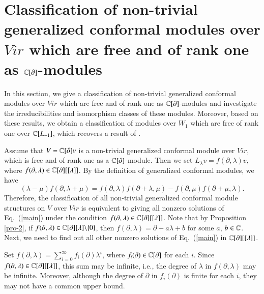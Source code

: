 \documentclass[12pt]{amsart}
\begin{document}
\section{Classification of non-trivial generalized conformal modules over $Vir$ which are free and of rank one as $\mathbb{C}[\partial]$-modules}
In this section, we give a classification of non-trivial generalized conformal modules over $Vir$ which are free and of rank one as $\mathbb{C}[\partial]$-modules and investigate the irreducibilities and isomorphism classes of these modules. Moreover, based on these results, we obtain a classification of modules over $W_1$ which are free of rank one over $\mathbb{C}[L_{-1}]$, which recovers a result of \cite{HCL}.

Assume that $V=\mathbb{C}[\partial]v$ is a non-trivial generalized conformal module over $Vir$, which is free and of rank one as a $\mathbb{C}[\partial]$-module.
Then we set $L_\lambda v=f(\partial, \lambda)v$, where $f(\partial, \lambda)\in \mathbb{C}[\partial][[\lambda]]$. By the definition of generalized conformal modules, we have
\begin{equation}\label{main}
(\lambda-\mu)f(\partial, \lambda+\mu)=f(\partial, \lambda)f(\partial+\lambda,\mu)
-f(\partial, \mu)f(\partial+\mu, \lambda).
\end{equation}
Therefore, the classification of all non-trivial generalized conformal module structures on $V$ over $Vir$ is equivalent to giving all nonzero solutions of Eq.~(\ref{main}) under the condition $f(\partial, \lambda)\in \mathbb{C}[\partial][[\lambda]]$. Note that by Proposition \ref{pro-2}, if $f(\partial, \lambda)\in \mathbb{C}[\partial][\lambda]\backslash\{0\}$, then $f(\partial, \lambda)=\partial+a \lambda+b$ for some $a$, $b\in \mathbb{C}$. Next, we need to find out all other nonzero solutions of Eq.~(\ref{main}) in $\mathbb{C}[\partial][[\lambda]]$.

Set $f(\partial, \lambda)=\sum_{i=0}^\infty f_i(\partial)\lambda^i$, where $f_i(\partial)\in \mathbb{C}[\partial]$ for each $i$.
Since $f(\partial, \lambda)\in \mathbb{C}[\partial][[\lambda]]$, this sum may be infinite, i.e., the degree of $\lambda$ in $f(\partial, \lambda)$ may be infinite. Moreover, although the degree of $\partial$ in $f_i(\partial)$ is finite for each $i$, they may not have
a common upper bound.
\end{document}
